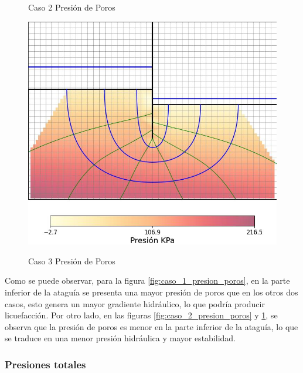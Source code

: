 \begin{figure}[H]
\begin{minipage}{0.32\textwidth}
        \caption{Caso 2 Presión de Poros}
        \label{fig:caso_2_presion_poros}
    \end{minipage}
    \begin{minipage}{0.32\textwidth}
        \centering
        \includegraphics[width=\textwidth]{GRAFICOS/caso_3_presion_poros.jpg}
        \caption{Caso 3 Presión de Poros}
        \label{fig:caso_3_presion_poros}
    \end{minipage}
\end{figure}

Como se puede observar, para la figura \ref{fig:caso_1_presion_poros}, en la parte inferior de la ataguía se presenta una mayor presión de poros que en los otros dos casos, esto genera un mayor gradiente hidráulico, lo que podría producir licuefacción. Por otro lado, en las figuras \ref{fig:caso_2_presion_poros} y \ref{fig:caso_3_presion_poros}, se observa que la presión de poros es menor en la parte inferior de la ataguía, lo que se traduce en una menor presión hidráulica y mayor estabilidad.

\subsubsection{Presiones totales}


